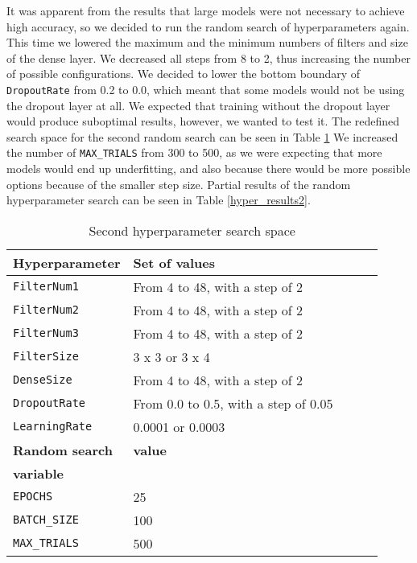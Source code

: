 It was apparent from the results that large models were not necessary to achieve high accuracy, so we decided to run the random search of hyperparameters again.
This time we lowered the maximum and the minimum numbers of filters and size of the dense layer.
We decreased all steps from 8 to 2, thus increasing the number of possible configurations.
We decided to lower the bottom boundary of \verb|DropoutRate| from 0.2 to 0.0, which meant that some models would not be using the dropout layer at all.
We expected that training without the dropout layer would produce suboptimal results, however, we wanted to test it.
The redefined search space for the second random search can be seen in Table \ref{hyper_table2}
We increased the number of \verb|MAX_TRIALS| from 300 to 500, as we were expecting that more models would end up underfitting, and also because there would be more possible options because of the smaller step size.
\newline
Partial results of the random hyperparameter search can be seen in Table \ref{hyper_results2}.
\newline
\begin{table}[ht]
    \centering
    \caption{ Second hyperparameter search space}
    \begin{tabular}{@{} *5l @{}}    \toprule
        \textbf{Hyperparameter} & \textbf{Set of values}\\\midrule
        \verb|FilterNum1|       & From 4 to 48, with a step of 2\\ 
        \verb|FilterNum2|       & From 4 to 48, with a step of 2\\ 
        \verb|FilterNum3|       & From 4 to 48, with a step of 2\\
        \verb|FilterSize|       & 3 x 3 or 3 x 4\\
        \verb|DenseSize|        & From 4 to 48, with a step of 2\\
        \verb|DropoutRate|      & From 0.0 to 0.5, with a step of 0.05\\
        \verb|LearningRate|     & 0.0001 or 0.0003\\\toprule
        \textbf{Random search}  & \textbf{value}\\
        \textbf{variable}       & \\\midrule
        \verb|EPOCHS|           & 25\\
        \verb|BATCH_SIZE|       & 100\\
        \verb|MAX_TRIALS|       & 500\\\bottomrule
    \end{tabular}
    \label{hyper_table2}
\end{table}
